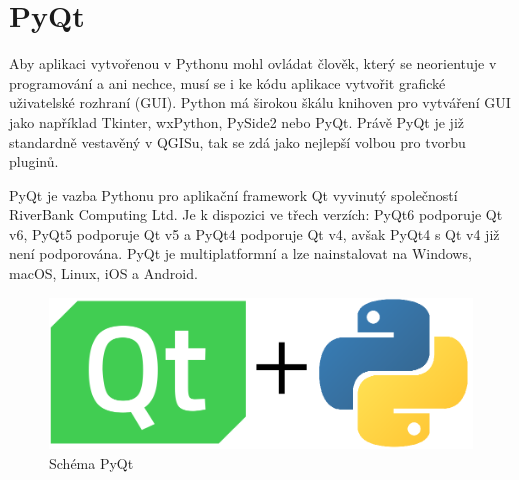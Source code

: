 \section{PyQt}
Aby aplikaci vytvořenou v Pythonu mohl ovládat člověk, který se neorientuje v programování a ani nechce,
musí se i ke kódu aplikace vytvořit grafické uživatelské rozhraní (GUI). Python má širokou škálu knihoven
pro vytváření GUI jako například Tkinter, wxPython, PySide2 nebo PyQt. Právě PyQt je již standardně 
vestavěný v QGISu, tak se zdá jako nejlepší volbou pro tvorbu pluginů.  

PyQt je vazba Pythonu pro aplikační framework Qt vyvinutý společností RiverBank Computing Ltd.
Je k dispozici ve třech verzích: PyQt6 podporuje Qt v6, PyQt5 podporuje Qt v5 a PyQt4 podporuje Qt v4,
avšak PyQt4 s Qt v4 již není podporována. PyQt je multiplatformní a lze nainstalovat na Windows,
macOS, Linux, iOS a Android. \cite{pyqt}

\begin{figure}[H] \centering
    \includegraphics[width=400pt]{./pictures/pyqt.png}
    \caption[Schéma PyQt Pythonu]{Schéma PyQt}
	\label{fig:pyqt}                                
\end{figure} 